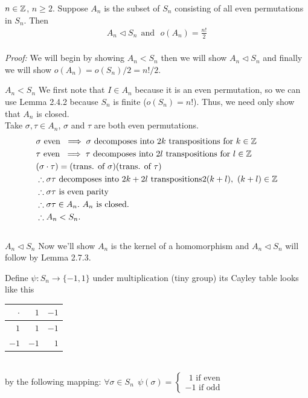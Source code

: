 \begin{lemma}
$n\in {\mathbb{Z}}$, $n\geq 2$. Suppose $A_n$ is the subset of $S_n$ consisting of all even permutations in
$S_n$. Then
\begin{align}
    A_n \triangleleft S_n \ \ \text{and} \ \ \  o(A_n)=\frac{n!}{2}\nonumber
\end{align} \\
\noindent \textit{Proof:} We will begin by showing $A_n < S_n$ then we will show
$A_n\triangleleft S_n$ and finally we will show $o(A_n)=o(S_n)/2 = n!/2$. \steezybreak

\noindent $\boxed{A_n < S_n}$ We first note that $I\in A_n$ because it is an even permutation, so we
can use Lemma 2.4.2 because $S_n$ is finite ($o(S_n)=n!$). Thus, we need only show that $A_n$ is
closed. \steezybreak \\
Take $\sigma, \tau \in A_n$, $\sigma$ and $\tau$ are both even permutations.
\begin{align}
    &\sigma \text{ even }\implies \sigma \text{ decomposes into }2k \text{ transpositions for } k\in {\mathbb{Z}} \nonumber \\
    &\tau \text{ even }\implies \tau \text{ decomposes into }2l \text{ transpositions for } l\in {\mathbb{Z}} \nonumber \\
    &(\sigma \cdot \tau) = (\text{trans. of }\sigma)(\text{trans. of }\tau)\nonumber \\
    &\therefore \sigma\tau \text{ decomposes into }2k+2l \text{ transpositions} 2(k+l), \ (k+l)\in {\mathbb{Z}} \nonumber \\
    &\therefore \sigma \tau \text{ is even parity} \nonumber \\
    &\therefore \sigma \tau \in A_n. \ A_n\text{ is closed.} \nonumber \\
    &\therefore A_n < S_n. \nonumber
\end{align}\\
\noindent $\boxed{A_n \triangleleft S_n}$ Now we'll show $A_n$ is the kernel of a homomorphism and
$A_n \triangleleft S_n$ will follow by Lemma 2.7.3. \steezybreak

\noindent Define $\psi : S_n \rightarrow \{-1,1\} \text{ under multiplication}$ (tiny group) its
Cayley table looks like this
\begin{tabular}{r|rr}
$\cdot$ & $1$  & $-1$ \\ \hline
$1$     & $1$  & $-1$ \\
$-1$    & $-1$ & $1$
\end{tabular}\\
by the following mapping: $\forall \sigma \in S_n \ \ \psi(\sigma)= \begin{cases}
  \ \ 1 \text{ if even} \\
  -1\text{ if odd}
\end{cases}$\\


\end{lemma}
